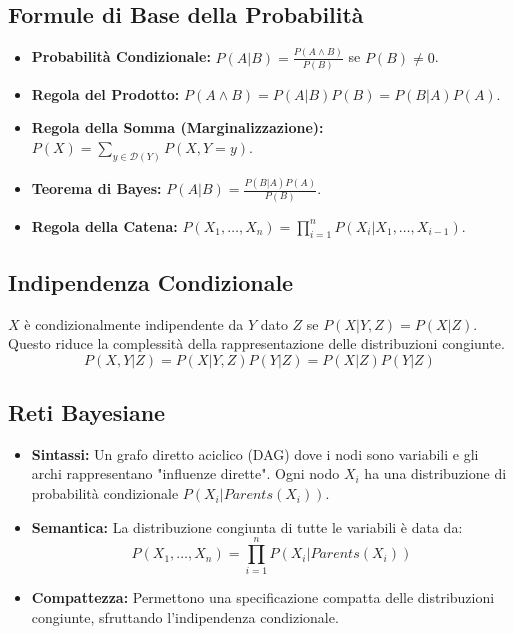 \documentclass[a4paper,11pt]{article}
\begin{document}
\subsection{Formule di Base della Probabilità}
\begin{itemize}
    \item \textbf{Probabilità Condizionale:} $P(A|B) = \frac{P(A \wedge B)}{P(B)}$ se $P(B) \neq 0$.
    \item \textbf{Regola del Prodotto:} $P(A \wedge B) = P(A|B)P(B) = P(B|A)P(A)$.
    \item \textbf{Regola della Somma (Marginalizzazione):} $P(X) = \sum_{y \in \mathcal{D}(Y)} P(X, Y=y)$.
    \item \textbf{Teorema di Bayes:} $P(A|B) = \frac{P(B|A)P(A)}{P(B)}$.
    \item \textbf{Regola della Catena:} $P(X_1, \ldots, X_n) = \prod_{i=1}^n P(X_i | X_1, \ldots, X_{i-1})$.
\end{itemize}

\subsection{Indipendenza Condizionale}
$X$ è condizionalmente indipendente da $Y$ dato $Z$ se $P(X|Y, Z) = P(X|Z)$. Questo riduce la complessità della rappresentazione delle distribuzioni congiunte.
\begin{equation}
    P(X, Y | Z) = P(X|Y, Z)P(Y|Z) = P(X|Z)P(Y|Z)
\end{equation}

\subsection{Reti Bayesiane}
\begin{itemize}
    \item \textbf{Sintassi:} Un grafo diretto aciclico (DAG) dove i nodi sono variabili e gli archi rappresentano "influenze dirette". Ogni nodo $X_i$ ha una distribuzione di probabilità condizionale $P(X_i | Parents(X_i))$.
    \item \textbf{Semantica:} La distribuzione congiunta di tutte le variabili è data da:
    \begin{equation}
        P(X_1, \ldots, X_n) = \prod_{i=1}^n P(X_i | Parents(X_i))
    \end{equation}
    \item \textbf{Compattezza:} Permettono una specificazione compatta delle distribuzioni congiunte, sfruttando l'indipendenza condizionale.
\end{itemize}
\end{document}
